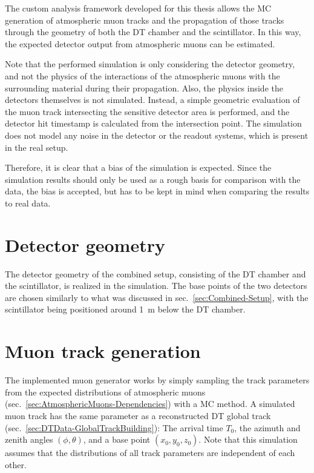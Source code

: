 \FloatBarrier
\label{sec:Simulation}

The custom analysis framework developed for this thesis \cite{dt-scint-analysis-tools-Main} allows the \acf{MC} generation of atmospheric muon tracks and the propagation of those tracks through the geometry of both the \ac{DT} chamber and the scintillator. In this way, the expected detector output from atmospheric muons can be estimated.
\par Note that the performed simulation is only considering the detector geometry, and not the physics of the interactions of the atmospheric muons with the surrounding material during their propagation. Also, the physics inside the detectors themselves is not simulated. Instead, a simple geometric evaluation of the muon track intersecting the sensitive detector area is performed, and the detector hit timestamp is calculated from the intersection point. The simulation does not model any noise in the detector or the readout systems, which is present in the real setup.
\par Therefore, it is clear that a bias of the simulation is expected. Since the simulation results should only be used as a rough basis for comparison with the data, the bias is accepted, but has to be kept in mind when comparing the results to real data.

\FloatBarrier
\section{Detector geometry}
\label{sec:Simulation-Geometry}

The detector geometry of the combined setup, consisting of the \ac{DT} chamber and the scintillator, is realized in the simulation. The base points of the two detectors are chosen similarly to what was discussed in sec.\ \ref{sec:Combined-Setup}, with the scintillator being positioned around \SI{1}{\meter} below the \ac{DT} chamber.

\FloatBarrier
\section{Muon track generation}
\label{sec:Simulation-Generation}

The implemented muon generator works by simply sampling the track parameters from the expected distributions of atmospheric muons (sec.\ \ref{sec:AtmosphericMuons-Dependencies}) with a \ac{MC} method. A simulated muon track has the same parameter as a reconstructed \ac{DT} global track (sec.\ \ref{sec:DTData-GlobalTrackBuilding}): The arrival time $T_0$, the azimuth and zenith angles $(\phi,\theta)$, and a base point $(x_0,y_0,z_0)$. Note that this simulation assumes that the distributions of all track parameters are independent of each other.
